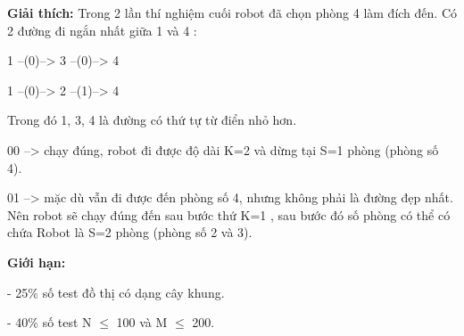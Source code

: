 \textbf{Giải thích: } Trong 2 lần thí nghiệm cuối robot đã chọn phòng 4 làm đích đến. Có 2 đường đi ngắn nhất giữa 1 và 4 :

1 --(0)--> 3 --(0)--> 4

1 --(0)--> 2 --(1)--> 4

Trong đó 1, 3, 4 là đường có thứ tự từ điển nhỏ hơn.

00 --> chạy đúng, robot đi được độ dài K=2 và dừng tại S=1 phòng (phòng số 4).

01 --> mặc dù vẫn đi được đến phòng số 4, nhưng không phải là đường đẹp nhất. Nên robot sẽ chạy đúng đến sau bước thứ K=1 , sau bước đó số phòng có thể có chứa Robot là S=2 phòng (phòng số 2 và 3).

\textbf{Giới hạn: }

- 25\% số test đồ thị có dạng cây khung.

- 40\% số test N $\le$ 100 và M $\le$ 200.
